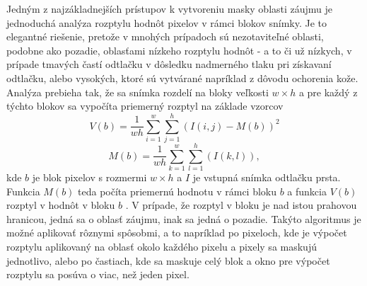   Jedným z najzákladnejších prístupov k vytvoreniu masky oblasti záujmu je jednoduchá analýza rozptylu hodnôt pixelov v rámci blokov snímky. Je to elegantné
  riešenie, pretože v mnohých prípadoch sú nezotaviteľné oblasti, podobne ako pozadie, oblasťami nízkeho rozptylu hodnôt - a to či už nízkych, v prípade
  tmavých častí odtlačku v dôsledku nadmerného tlaku pri získavaní odtlačku, alebo vysokých, ktoré sú vytvárané napríklad z dôvodu ochorenia kože. 
  Analýza prebieha tak, že sa snímka rozdelí na bloky veľkosti $w\times{}h$ a pre každý z týchto blokov sa vypočíta priemerný rozptyl na základe vzorcov
  \begin{equation}
    V(b) = \frac{1}{wh} \sum_{i=1}^{w}\sum_{j=1}^{h}(I(i,j) - M(b))^2
  \end{equation}
  \begin{equation}
    M(b) = \frac{1}{wh} \sum_{k=1}^{w}\sum_{l=1}^{h}(I(k,l)),
  \end{equation}
  kde $b$ je blok pixelov s rozmermi $w\times{}h$ a $I$ je vstupná snímka odtlačku prsta. Funkcia $M(b)$ teda počíta priemernú hodnotu v rámci bloku $b$
  a funkcia $V(b)$ rozptyl v hodnôt v bloku $b$ \cite{babatunde2012FP_enhancement}. V prípade, že rozptyl v bloku je nad istou prahovou hranicou, jedná sa
  o oblasť záujmu, inak sa jedná o pozadie. Takýto algoritmus je možné aplikovať rôznymi spôsobmi, a to napríklad po pixeloch, kde je výpočet rozptylu
  aplikovaný na oblasť okolo každého pixelu a pixely sa maskujú jednotlivo, alebo po častiach, kde sa maskuje celý blok a okno pre výpočet rozptylu sa
  posúva o viac, než jeden pixel.

